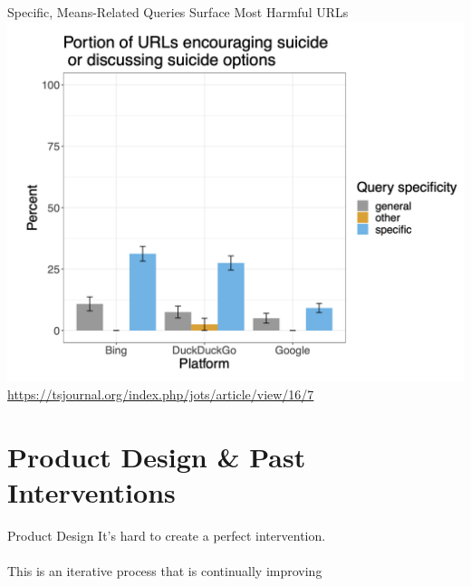 \documentclass[nobackground,dvipsnames,table,aspectratio=169]{beamer}
\begin{document}
\begin{frame}{Specific, Means-Related Queries Surface Most Harmful URLs}
    \centering
    \includegraphics[height=0.75\textheight]{hsehsq-specific-most-harmful}
    \tiny
    \url{https://tsjournal.org/index.php/jots/article/view/16/7}
\end{frame}

\section{Product Design \& Past Interventions}

\begin{frame}{Product Design}
    \large
    It’s hard to create a perfect intervention.\\~\\
    This is an iterative process that is continually improving
\end{frame}
\end{document}
